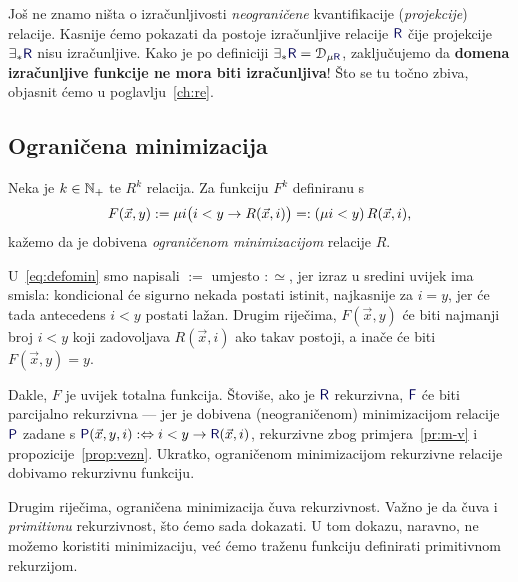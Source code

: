 Još ne znamo ništa o izračunljivosti \emph{neograničene} kvantifikacije (\emph{projekcije}) relacije. Kasnije ćemo pokazati da postoje izračunljive relacije $\f R$ čije projekcije $\exists_*\f R$ nisu izračunljive. Kako je po definiciji $\exists_*\f R=\dom{\mu\f R}$, zaključujemo da \textbf{domena izračunljive funkcije ne mora biti izračunljiva}! Što se tu točno zbiva, objasnit ćemo u poglavlju~\ref{ch:re}. %

\subsection{Ograničena minimizacija}

\begin{definicija}[{name=[ograničena minimizacija]}]
Neka je $k\in{\mathbb N}_+$ te $R^k$ relacija. Za funkciju $F^k$ definiranu s
\begin{equation}\label{eq:defomin}
	F(\vec x,y):=\mu i\bigl(i<y\to R(\vec x,i)\bigr)=:(\mu i<y)\,R(\vec x,i)\text,
\end{equation}
kažemo da je dobivena \emph{ograničenom minimizacijom} relacije $R$.
\end{definicija}

\begin{napomena}[{name=[ograničena minimizacija čuva rekurzivnost]}]\label{nap:mintot}
U~\eqref{eq:defomin} smo napisali $:=$ umjesto $:\simeq$, jer izraz u sredini uvijek ima smisla: kondicional će sigurno nekada postati istinit, najkasnije za $i=y$, jer će tada antecedens $i<y$ postati lažan. Drugim riječima, $F(\vec x,y)$ će biti najmanji broj $i<y$ koji zadovoljava $R(\vec x,i)$ ako takav postoji, a inače će biti $F(\vec x,y)=y$.

	Dakle, $F$ je uvijek totalna funkcija. Štoviše, ako je $\f R$ rekurzivna, $\f F$ će biti parcijalno rekurzivna --- jer je dobivena (neograničenom) minimizacijom relacije $\f P$ zadane s $\f P(\vec x,y,i):\Leftrightarrow i<y\to\f R(\vec x,i)$, rekurzivne zbog primjera~\ref{pr:m-v} i propozicije~\ref{prop:vezn}. Ukratko, ograničenom minimizacijom rekurzivne relacije dobivamo rekurzivnu funkciju.
\end{napomena}

Drugim riječima, ograničena minimizacija čuva rekurzivnost. Važno je da čuva i \emph{primitivnu} rekurzivnost, što ćemo sada dokazati. U tom dokazu, naravno, ne možemo koristiti minimizaciju, već ćemo traženu funkciju definirati primitivnom rekurzijom.

